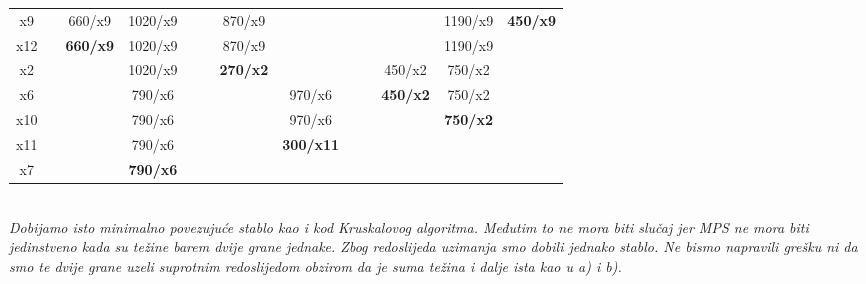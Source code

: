 \documentclass[12pt]{article}
\begin{document}
\begin{enumerate}
\begin{center}
{\begin{tabular}{|c|c|c|c|ccccccccc}
x9 &  & 660/x9 & 1020/x9 &  & \multicolumn{1}{c|}{} & \multicolumn{1}{c|}{870/x9} & \multicolumn{1}{c|}{} &  & \multicolumn{1}{c|}{\textbf{}} & \multicolumn{1}{c|}{} & \multicolumn{1}{c|}{1190/x9} & \multicolumn{1}{c|}{\textbf{450/x9}} \\ \cline{1-4} \cline{7-8} \cline{11-13} 
x12 &  & \textbf{660/x9} & 1020/x9 &  & \multicolumn{1}{c|}{} & \multicolumn{1}{c|}{870/x9} & \multicolumn{1}{c|}{} &  & \multicolumn{1}{c|}{} & \multicolumn{1}{c|}{} & \multicolumn{1}{c|}{1190/x9} &  \\ \cline{1-4} \cline{7-8} \cline{11-12}
x2 &  &  & 1020/x9 &  & \multicolumn{1}{c|}{} & \multicolumn{1}{c|}{\textbf{270/x2}} & \multicolumn{1}{c|}{} &  & \multicolumn{1}{c|}{} & \multicolumn{1}{c|}{450/x2} & \multicolumn{1}{c|}{750/x2} &  \\ \cline{1-2} \cline{4-4} \cline{7-8} \cline{11-12}
x6 &  & \textbf{} & 790/x6 &  &  & \multicolumn{1}{c|}{} & \multicolumn{1}{c|}{970/x6} &  & \multicolumn{1}{c|}{} & \multicolumn{1}{c|}{\textbf{450/x2}} & \multicolumn{1}{c|}{750/x2} &  \\ \cline{1-2} \cline{4-4} \cline{8-8} \cline{11-12}
x10 &  &  & 790/x6 &  &  & \multicolumn{1}{c|}{} & \multicolumn{1}{c|}{970/x6} &  &  & \multicolumn{1}{c|}{} & \multicolumn{1}{c|}{\textbf{750/x2}} &  \\ \cline{1-2} \cline{4-4} \cline{8-8} \cline{12-12}
x11 &  &  & 790/x6 &  &  & \multicolumn{1}{c|}{} & \multicolumn{1}{c|}{\textbf{300/x11}} &  &  &  & \textbf{} &  \\ \cline{1-2} \cline{4-4} \cline{8-8}
x7 &  &  & \textbf{790/x6} &  &  &  &  &  & \textbf{} & \textbf{} &  &  \\ \cline{1-2} \cline{4-4}

\end{tabular}%
}\\
\vspace{0.5cm}
\textit{Dobijamo isto minimalno povezujuće stablo kao i kod Kruskalovog algoritma. Međutim to ne mora biti slučaj jer MPS ne mora biti jedinstveno kada su težine barem dvije grane jednake. Zbog redoslijeda uzimanja smo dobili jednako stablo. Ne bismo napravili grešku ni da smo te dvije grane uzeli suprotnim redoslijedom obzirom da je suma težina i dalje ista kao u a) i b).}


\end{center}
\end{enumerate}
\end{document}

